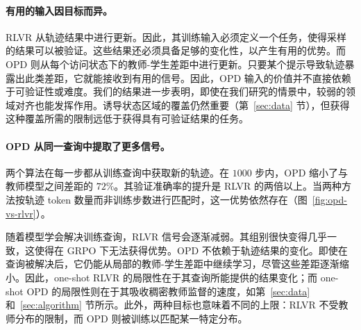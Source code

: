 \paragraph{有用的输入因目标而异。}
RLVR 从轨迹结果中进行更新。因此，其训练输入必须定义一个任务，使得采样的结果可以被验证。这些结果还必须具备足够的变化性，以产生有用的优势。而 OPD 则从每个访问状态下的教师-学生差距中进行更新。只要某个提示导致轨迹暴露出此类差距，它就能接收到有用的信号。因此，OPD 输入的价值并不直接依赖于可验证性或难度。我们的结果进一步表明，即使在我们研究的情景中，较弱的领域对齐也能发挥作用。诱导状态区域的覆盖仍然重要（第~\ref{sec:data} 节），但获得这种覆盖所需的限制远低于获得具有可验证结果的任务。

\paragraph{OPD 从同一查询中提取了更多信号。}
两个算法在每一步都从训练查询中获取新的轨迹。在 \(1000\) 步内，OPD 缩小了与教师模型之间差距的 \(72\%\)。其验证准确率的提升是 RLVR 的两倍以上。当两种方法按轨迹 token 数量而非训练步数进行匹配时，这一优势依然存在（图~\ref{fig:opd-vs-rlvr}）。

随着模型学会解决训练查询，RLVR 信号会逐渐减弱。其组别很快变得几乎一致，这使得在 GRPO 下无法获得优势。OPD 不依赖于轨迹结果的变化。即使在查询被解决后，它仍能从局部的教师-学生差距中继续学习，尽管这些差距逐渐缩小。因此，one-shot RLVR 的局限性在于其查询所能提供的结果变化；而 one-shot OPD 的局限性则在于其吸收稠密教师监督的速度，如第~\ref{sec:data} 和~\ref{sec:algorithm} 节所示。此外，两种目标也意味着不同的上限：RLVR 不受教师分布的限制，而 OPD 则被训练以匹配某一特定分布。
